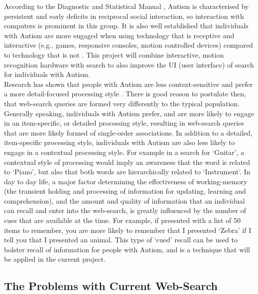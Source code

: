 \documentclass[a4paper, 11pt]{article}
\begin{document}
According to the Diagnostic and Statistical Manual \cite{CDC}, Autism is characterised by persistent and early deficits in reciprocal social interaction, so interaction with computers is prominent in this group. It is also well established that individuals with Autism are more engaged when using technology that is receptive and interactive (e.g., games, responsive consoles, motion controlled devices) compared to technology that is not \cite{motioncontrollerforautism}. This project will combine interactive, motion recognition hardware with search to also improve the UI (user interface) of search for individuals with Autism.\\

\vspace{5mm}
Research has shown that people with Autism are less context-sensitive and prefer a more detail-focused processing style \cite{mottron}. There is good reason to postulate then, that web-search queries are formed very differently to the typical population. Generally speaking, individuals with Autism prefer, and are more likely to engage in an item-specific, or detailed processing style, resulting in web-search queries that are more likely formed of single-order associations. In addition to a detailed, item-specific processing style, individuals with Autism are also less likely to engage in a contextual processing style. For example in a search for `Guitar', a contextual style of processing would imply an awareness that the word is related to `Piano', but also that both words are hierarchically related to `Instrument'. In day to day life, a major factor determining the effectiveness of working-memory (the transient holding and processing of information for updating, learning and comprehension), and the amount and quality of information that an individual can recall and enter into the web-search, is greatly influenced by the number of cues that are available at the time. For example, if presented with a list of 50 items to remember, you are more likely to remember that I presented `Zebra' if I tell you that I presented an animal. This type of `cued' recall can be used to bolster recall of information for people with Autism, and is a technique that will be applied in the current project. \\

\subsection{The Problems with Current Web-Search}\label{What should search offer people with Autism}
\end{document}
